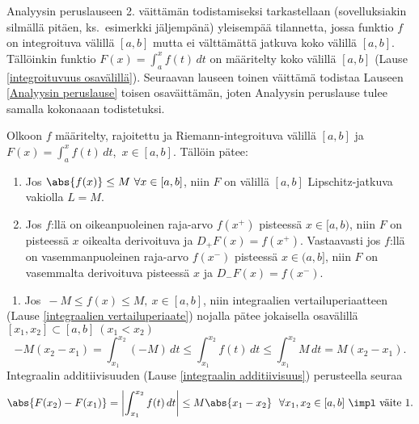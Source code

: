 Analyysin peruslauseen 2. väittämän todistamiseksi tarkastellaan (sovelluksiakin silmällä
pitäen, ks.\ esimerkki jäljempänä) yleisempää tilannetta, jossa funktio $f$ on integroituva 
välillä $[a,b]$ mutta ei välttämättä jatkuva koko välillä $[a,b]$. 
Tällöinkin funktio $F(x) = \int_a^x f(t)\,dt$ on määritelty koko välillä $[a,b]$ 
(Lause \ref{integroituvuus osavälillä}). Seuraavan lauseen toinen väittämä todistaa Lauseen
\ref{Analyysin peruslause} toisen osaväittämän, joten Analyysin peruslause tulee samalla
kokonaaan todistetuksi.
\begin{Lause} \label{Analyysin peruslause 2} Olkoon $f$ määritelty, rajoitettu ja
Riemann-integroituva välillä $[a,b]$ ja $F(x)=\int_a^x f(t)\,dt$, $\,x\in[a,b]$. Tällöin pätee:
\begin{enumerate}
\item Jos $\abs{f(x)}\leq M \ \forall x\in [a,b]$, niin $F$ on välillä $[a,b]$ Lipschitz-jatkuva
      vakiolla $L=M$.
\item Jos $f$:llä on oikeanpuoleinen raja-arvo $f(x^+)$ pisteessä $x\in[a,b)$, niin $F$ on 
      pisteessä $x$ oikealta derivoituva ja $D_+F(x)=f(x^+)$. Vastaavasti jos $f$:llä on 
      vasemmanpuoleinen raja-arvo $f(x^-)$ pisteessä $x\in(a,b]$, niin $F$ on vasemmalta 
      derivoituva pisteessä $x$ ja $D_-F(x)=f(x^-)$.
\end{enumerate}
\end{Lause}
\tod \ 1. Jos $\,-M \le f(x) \le M,\ x\in[a,b]$, niin integraalien vertailuperiaatteen
(Lause \ref{integraalien vertailuperiaate}) nojalla pätee jokaisella osavälillä 
$[x_1,x_2]\subset[a,b]\ (x_1<x_2)$
\[
-M(x_2-x_1) = \int_{x_1}^{x_2} (-M)\,dt \le \int_{x_1}^{x_2} f(t)\,dt 
              \le \int_{x_1}^{x_2} M\,dt = M(x_2-x_1).
\]
Integraalin additiivisuuden (Lause \ref{integraalin additiivisuus}) perusteella seuraa
\[
\abs{F(x_2)-F(x_1)} = \left|\int_{x_1}^{x_2} f(t)\,dt\right| 
                      \le M \abs{x_1-x_2}\ \ \forall x_1,x_2\in[a,b]\ \impl\ \text{väite 1.}
\]

